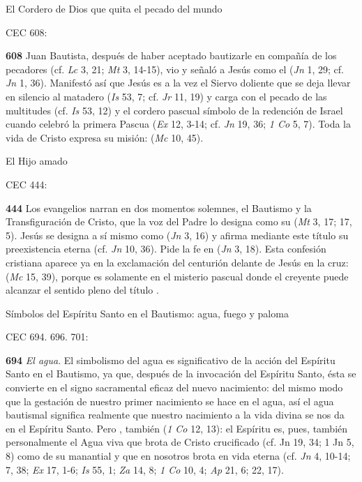 {El Cordero de Dios que quita el pecado del mundo

CEC 608:

\textbf{608} Juan Bautista, después de haber aceptado bautizarle en compañía de los pecadores (cf. \emph{Lc} 3, 21; \emph{Mt} 3, 14-15), vio y señaló a Jesús como el  (\emph{Jn} 1, 29; cf. \emph{Jn} 1, 36). Manifestó así que Jesús es a la vez el Siervo doliente que se deja llevar en silencio al matadero (\emph{Is} 53, 7; cf. \emph{Jr} 11, 19) y carga con el pecado de las multitudes (cf. \emph{Is} 53, 12) y el cordero pascual símbolo de la redención de Israel cuando celebró la primera Pascua (\emph{Ex} 12, 3-14; cf. \emph{Jn} 19, 36; \emph{1 Co} 5, 7). Toda la vida de Cristo expresa su misión:  (\emph{Mc} 10, 45).

El Hijo amado

CEC 444:

\textbf{444} Los evangelios narran en dos momentos solemnes, el Bautismo y la Transfiguración de Cristo, que la voz del Padre lo designa como su  (\emph{Mt} 3, 17; 17, 5). Jesús se designa a sí mismo como  (\emph{Jn} 3, 16) y afirma mediante este título su preexistencia eterna (cf. \emph{Jn} 10, 36). Pide la fe en  (\emph{Jn} 3, 18). Esta confesión cristiana aparece ya en la exclamación del centurión delante de Jesús en la cruz:  (\emph{Mc} 15, 39), porque es solamente en el misterio pascual donde el creyente puede alcanzar el sentido pleno del título .

Símbolos del Espíritu Santo en el Bautismo: agua, fuego y paloma

CEC 694. 696. 701:

\textbf{694} \emph{El agua}. El simbolismo del agua es significativo de la acción del Espíritu Santo en el Bautismo, ya que, después de la invocación del Espíritu Santo, ésta se convierte en el signo sacramental eficaz del nuevo nacimiento: del mismo modo que la gestación de nuestro primer nacimiento se hace en el agua, así el agua bautismal significa realmente que nuestro nacimiento a la vida divina se nos da en el Espíritu Santo. Pero , también  (\emph{1 Co} 12, 13): el Espíritu es, pues, también personalmente el Agua viva que brota de Cristo crucificado (cf. Jn 19, 34; 1 Jn 5, 8) como de su manantial y que en nosotros brota en vida eterna (cf. \emph{Jn} 4, 10-14; 7, 38; \emph{Ex} 17, 1-6; \emph{Is} 55, 1; \emph{Za} 14, 8; \emph{1 Co} 10, 4; \emph{Ap} 21, 6; 22, 17).

}
